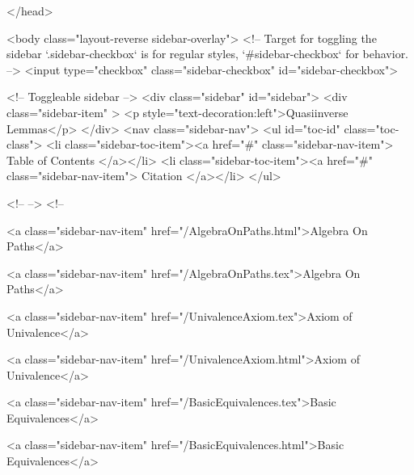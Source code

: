   
</head>




  <body class="layout-reverse sidebar-overlay">
    <!-- Target for toggling the sidebar `.sidebar-checkbox` is for regular
     styles, `#sidebar-checkbox` for behavior. -->
<input type="checkbox" class="sidebar-checkbox" id="sidebar-checkbox">

<!-- Toggleable sidebar -->
<div class="sidebar" id="sidebar">
  <div class="sidebar-item" >
    <p style="text-decoration:left">Quasiinverse Lemmas</p>
  </div>
  <nav class="sidebar-nav">
    <ul id="toc-id" class="toc-class">
  <li class="sidebar-toc-item"><a href="#" class="sidebar-nav-item"> Table of Contents </a></li>
  <li class="sidebar-toc-item"><a href="#" class="sidebar-nav-item"> Citation </a></li>
</ul>


    <!--  -->
    <!-- 
      
    
      
    
      
    
      
    
      
        
      
    
      
        
          <a class="sidebar-nav-item" href="/AlgebraOnPaths.html">Algebra On Paths</a>
        
      
    
      
        
          <a class="sidebar-nav-item" href="/AlgebraOnPaths.tex">Algebra On Paths</a>
        
      
    
      
        
          <a class="sidebar-nav-item" href="/UnivalenceAxiom.tex">Axiom of Univalence</a>
        
      
    
      
        
          <a class="sidebar-nav-item" href="/UnivalenceAxiom.html">Axiom of Univalence</a>
        
      
    
      
        
          <a class="sidebar-nav-item" href="/BasicEquivalences.tex">Basic Equivalences</a>
        
      
    
      
        
          <a class="sidebar-nav-item" href="/BasicEquivalences.html">Basic Equivalences</a>
        
